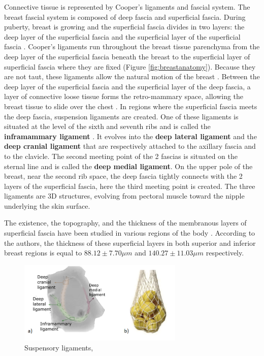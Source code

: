 Connective tissue is represented by Cooper's ligaments and fascial system. The breast fascial system is composed of deep fascia and superficial fascia. During puberty, breast is growing and the superficial fascia divides in two layers: the deep layer of the superficial fascia and the superficial layer of the superficial fascia \citep{kopans2007breast}.  Cooper's ligaments run throughout the breast tissue parenchyma from the deep layer of the superficial fascia beneath the breast to the superficial layer of superficial fascia where they are fixed (Figure \ref{fig:breastanatomy}). Because they are not taut, these ligaments allow the natural motion of the breast \citep{clemente2011anatomy}. Between the deep layer of the superficial fascia and the superficial layer of the deep fascia, a layer of connective loose tissue forms the retro-mammary space, allowing the breast tissue to slide over the chest \citep{mugea2014aesthetic}. In regions where the superficial fascia meets the deep fascia, suspension ligaments are created. One of these ligaments is situated at the level of the sixth and seventh ribs and is called the \textbf{inframammary ligament} \citep{bayati_inframammary_1995}. It evolves into the \textbf{deep lateral ligament} and the \textbf{deep cranial ligament} that are respectively attached to the axillary fascia and to the clavicle. The second meeting point of the 2 fascias is situated on the sternal line and is called the \textbf{deep medial ligament}. On the upper pole of the breast, near the second rib space, the deep fascia tightly connects with the 2 layers of the superficial fascia, here the third meeting point is created. The three ligaments are 3D structures, evolving from pectoral muscle toward the nipple underlying the skin surface.


The existence, the topography, and the thickness of the membranous layers of superficial fascia have been studied in various regions of the body \citep{abu_membranous_2006}. According to the authors, the thickness of these superficial layers in both superior and inferior breast regions is equal to $88.12 \pm 7.70 \mu m$ and $140.27 \pm 11.03 \mu m$ respectively.

\begin{figure}[!h]
\centering
\centerline{\includegraphics[width=0.7\textwidth,keepaspectratio]{figures/breastLigaments2.png} }
\caption{Suspensory ligaments,  \citep{mugea2014aesthetic}}
\label{fig:suspensoryligaments}
\end{figure}



